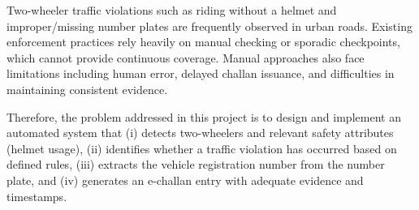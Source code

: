 Two-wheeler traffic violations such as riding without a helmet and improper/missing number plates are frequently observed in urban roads. Existing enforcement practices rely heavily on manual checking or sporadic checkpoints, which cannot provide continuous coverage. Manual approaches also face limitations including human error, delayed challan issuance, and difficulties in maintaining consistent evidence.

Therefore, the problem addressed in this project is to design and implement an automated system that (i) detects two-wheelers and relevant safety attributes (helmet usage), (ii) identifies whether a traffic violation has occurred based on defined rules, (iii) extracts the vehicle registration number from the number plate, and (iv) generates an e-challan entry with adequate evidence and timestamps.
